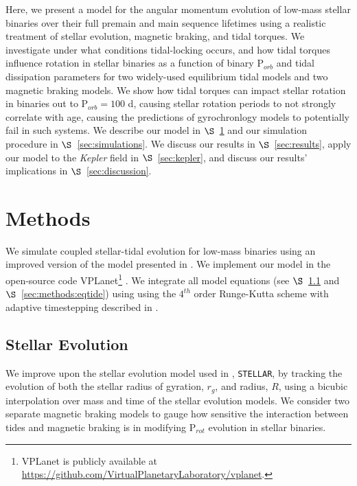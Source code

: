 \documentclass[twocolumn]{aastex61}
\newcommand{\stellar}[0]{\texttt{STELLAR}\xspace}
\newcommand{\kepler}[0]{\textit{Kepler}\xspace}
\begin{document}
Here, we present a model for the angular momentum evolution of low-mass stellar binaries over their full premain and main sequence lifetimes using a realistic treatment of stellar evolution, magnetic braking, and tidal torques. We investigate under what conditions tidal-locking occurs, and how tidal torques influence rotation in stellar binaries as a function of binary P$_{orb}$ and tidal dissipation parameters for two widely-used equilibrium tidal models and two magnetic braking models.  We show how tidal torques can impact stellar rotation in binaries out to P$_{orb} = 100$ d, causing stellar rotation periods to not strongly correlate with age, causing the predictions of gyrochronlogy models to potentially fail in such systems.  We describe our model in $\S$~\ref{sec:methods} and our simulation procedure in $\S$~\ref{sec:simulations}.  We discuss our results in $\S$~\ref{sec:results}, apply our model to the \kepler field in $\S$~\ref{sec:kepler}, and discuss our results' implications in $\S$~\ref{sec:discussion}.


\section{Methods} \label{sec:methods}

We simulate coupled stellar-tidal evolution for low-mass binaries using an improved version of the model presented in \citet{Fleming2018}.  We implement our model in the open-source code VPLanet\footnote{VPLanet is publicly available
at \href{https://github.com/VirtualPlanetaryLaboratory/vplanet}{{https://github.com/VirtualPlanetaryLaboratory/vplanet}}.} \citep[][Barnes et al., in prep]{Barnes2016,vplanet2018}.  We integrate all model equations (see $\S$~\ref{sec:methods:stellar} and $\S$~\ref{sec:methods:eqtide}) using using the $4^{th}$ order Runge-Kutta scheme with adaptive timestepping described in \citet{Fleming2018}.  

\subsection{Stellar Evolution} \label{sec:methods:stellar}

We improve upon the stellar evolution model used in \citet{Fleming2018}, \stellar, by tracking the evolution of both the stellar radius of gyration, $r_g$, and radius, $R$, using a bicubic interpolation over mass and time of the \citet{Baraffe2015} stellar evolution models. We consider two separate magnetic braking models to gauge how sensitive the interaction between tides and magnetic braking is in modifying P$_{rot}$ evolution in stellar binaries. 
\end{document}
